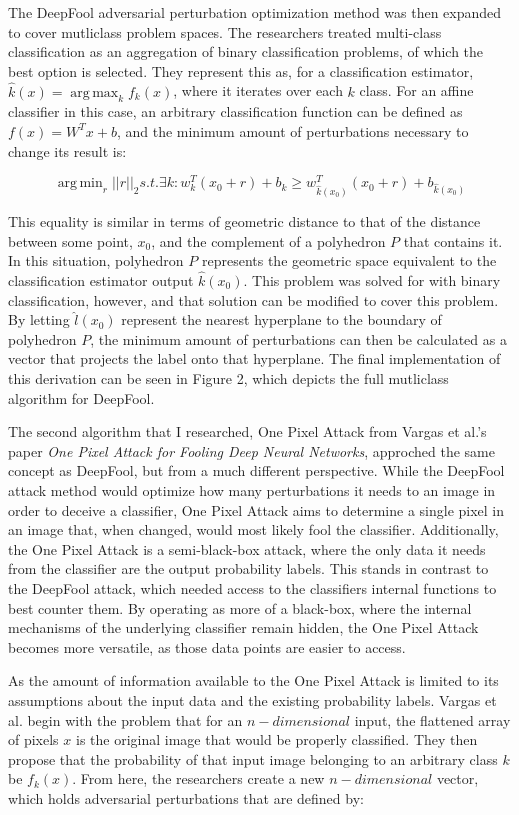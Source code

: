 \documentclass[../article.tex]{subfiles}
\DeclareMathOperator*{\argmin}{arg\,min}
\DeclareMathOperator*{\argmax}{arg\,max}
\begin{document}
The DeepFool adversarial perturbation optimization method was then expanded to cover mutliclass problem spaces. The researchers treated multi-class classification as an aggregation of binary classification problems, of which the best option is selected. They represent this as, for a classification estimator, $\hat{k}(x) = \argmax_{k} f_k(x)$, where it iterates over each $k$ class. For an affine classifier in this case, an arbitrary classification function can be defined as $f(x) = W^Tx + b$, and the minimum amount of perturbations necessary to change its result is:

\[\argmin_{r} ||r||_2 s.t. \exists k: w_k^T(x_0 + r) + b_k \geq w_{\hat{k}(x_0)}^T (x_0+r) + b_{\hat{k}(x_0)}\] 

This equality is similar in terms of geometric distance to that of the distance between some point, $x_0$, and the complement of a polyhedron $P$ that contains it. In this situation, polyhedron $P$ represents the geometric space equivalent to the classification estimator output $\hat{k}(x_0)$. This problem was solved for with binary classification, however, and that solution can be modified to cover this problem. By letting $\hat{l}(x_0)$ represent the nearest hyperplane to the boundary of polyhedron $P$, the minimum amount of perturbations can then be calculated as a vector that projects the label onto that hyperplane. The final implementation of this derivation can be seen in Figure 2, which depicts the full mutliclass algorithm for DeepFool.

The second algorithm that I researched, One Pixel Attack from Vargas et al.'s paper \emph{One Pixel Attack for Fooling Deep Neural Networks}, approched the same concept as DeepFool, but from a much different perspective. \cite{DBLP:journals/tec/SuVS19} While the DeepFool attack method would optimize how many perturbations it needs to an image in order to deceive a classifier, One Pixel Attack aims to determine a single pixel in an image that, when changed, would most likely fool the classifier. Additionally, the One Pixel Attack is a semi-black-box attack, where the only data it needs from the classifier are the output probability labels. This stands in contrast to the DeepFool attack, which needed access to the classifiers internal functions to best counter them. By operating as more of a black-box, where the internal mechanisms of the underlying classifier remain hidden, the One Pixel Attack becomes more versatile, as those data points are easier to access.

As the amount of information available to the One Pixel Attack is limited to its assumptions about the input data and the existing probability labels. Vargas et al. begin with the problem that for an $n-dimensional$ input, the flattened array of pixels $x$ is the original image that would be properly classified. They then propose that the probability of that input image belonging to an arbitrary class $k$ be $f_k(x)$. From here, the researchers create a new $n-dimensional$ vector, which holds adversarial perturbations that are defined by:
\end{document}
